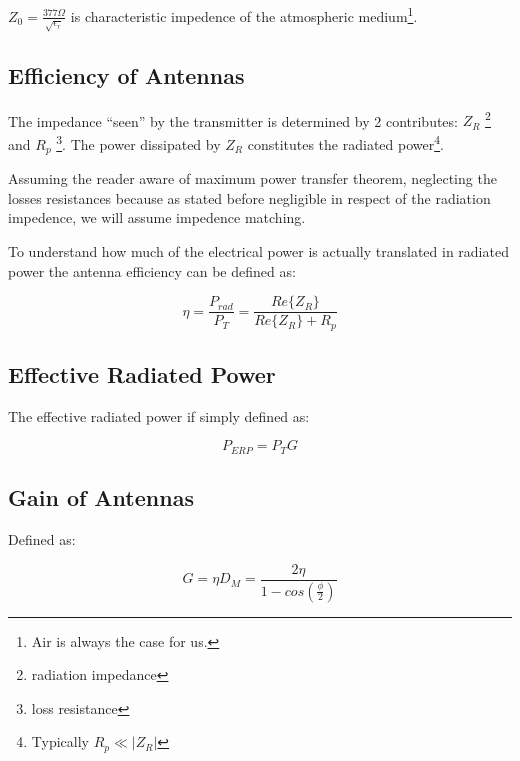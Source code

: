 $Z_0=\frac{377 \Omega}{\sqrt{\epsilon_r}}$ is characteristic impedence of the atmospheric medium\footnote{Air is always the case for us.}.


\subsection{Efficiency of Antennas} %
\label{sub:efficienty_of_antennas}

The impedance “seen” by the transmitter is determined by 2 contributes: $Z_R$ \footnote{radiation impedance} and $R_p$ \footnote{loss resistance}. The power dissipated by $Z_R$ constitutes the radiated power\footnote{Typically $R_p \ll |Z_R|$}.

Assuming the reader aware of maximum power transfer theorem, neglecting the losses resistances because as stated before negligible in respect of the radiation impedence, we will assume impedence matching.

To understand how much of the electrical power is actually translated in radiated power the antenna efficiency can be defined as:

\begin{equation}
  	\eta = \frac{P_{rad}}{P_T}= \frac{Re\{ Z_R \}}{Re\{ Z_R \}+R_p}
  \end{equation}  


\subsection{Effective Radiated Power} %
\label{sub:effective_radiated_power}

The effective radiated power if simply defined as:

\begin{equation}
	P_{ERP} = P_TG 
\end{equation}


\subsection{Gain of Antennas} %
\label{sub:gain_of_antenna}

Defined as:

\begin{equation}
	G = \eta D_M=\frac{2\eta}{1-cos(\frac{\phi}{2})}
\end{equation}

